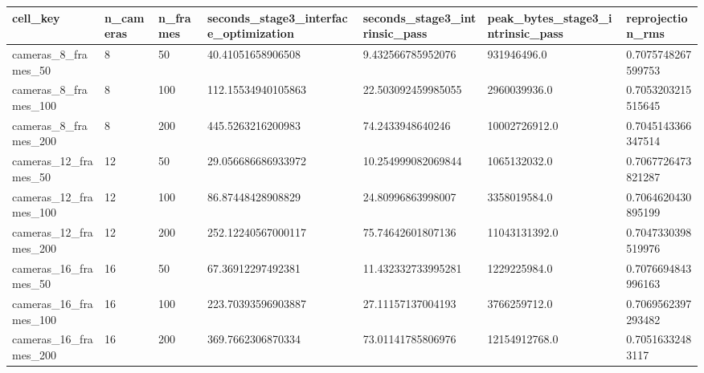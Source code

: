 \begin{tabular}{|l|l|l|l|l|l|l|}
\hline
cell\_key & n\_cameras & n\_frames & seconds\_stage3\_interface\_optimization & seconds\_stage3\_intrinsic\_pass & peak\_bytes\_stage3\_intrinsic\_pass & reprojection\_rms \\
\hline
cameras\_8\_frames\_50 & 8 & 50 & 40.41051658906508 & 9.432566785952076 & 931946496.0 & 0.7075748267599753 \\
cameras\_8\_frames\_100 & 8 & 100 & 112.15534940105863 & 22.503092459985055 & 2960039936.0 & 0.7053203215515645 \\
cameras\_8\_frames\_200 & 8 & 200 & 445.5263216200983 & 74.2433948640246 & 10002726912.0 & 0.7045143366347514 \\
cameras\_12\_frames\_50 & 12 & 50 & 29.056686686933972 & 10.254999082069844 & 1065132032.0 & 0.7067726473821287 \\
cameras\_12\_frames\_100 & 12 & 100 & 86.87448428908829 & 24.80996863998007 & 3358019584.0 & 0.7064620430895199 \\
cameras\_12\_frames\_200 & 12 & 200 & 252.12240567000117 & 75.74642601807136 & 11043131392.0 & 0.7047330398519976 \\
cameras\_16\_frames\_50 & 16 & 50 & 67.36912297492381 & 11.432332733995281 & 1229225984.0 & 0.7076694843996163 \\
cameras\_16\_frames\_100 & 16 & 100 & 223.70393596903887 & 27.11157137004193 & 3766259712.0 & 0.7069562397293482 \\
cameras\_16\_frames\_200 & 16 & 200 & 369.7662306870334 & 73.01141785806976 & 12154912768.0 & 0.70516332483117 \\
\hline
\end{tabular}

